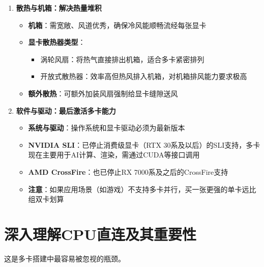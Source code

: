 \documentclass[12pt,UTF8]{ctexbook}
\begin{document}
\begin{enumerate}
    \item \textbf{散热与机箱：解决热量堆积}
    \begin{itemize}[leftmargin=2em]
        \item \textbf{机箱}：需宽敞、风道优秀，确保冷风能顺畅流经每张显卡
        \item \textbf{显卡散热器类型}：
        \begin{itemize}[leftmargin=2em]
            \item 涡轮风扇：将热气直接排出机箱，适合多卡紧密排列
            \item 开放式散热器：效率高但热风排入机箱，对机箱排风能力要求极高
        \end{itemize}
        \item \textbf{额外散热}：可额外加装风扇强制给显卡缝隙送风
    \end{itemize}
    
    \item \textbf{软件与驱动：最后激活多卡能力}
    \begin{itemize}[leftmargin=2em]
        \item \textbf{系统与驱动}：操作系统和显卡驱动必须为最新版本
        \item \textbf{NVIDIA SLI}：已停止消费级显卡（RTX 30系及以后）的SLI支持，多卡现在主要用于AI计算、渲染，需通过CUDA等接口调用
        \item \textbf{AMD CrossFire}：也已停止RX 7000系及之后的CrossFire支持
        \item \textbf{注意}：如果应用场景（如游戏）不支持多卡并行，买一张更强的单卡远比组双卡划算
    \end{itemize}
\end{enumerate}

\section{深入理解CPU直连及其重要性}

这是多卡搭建中最容易被忽视的瓶颈。
\end{document}
